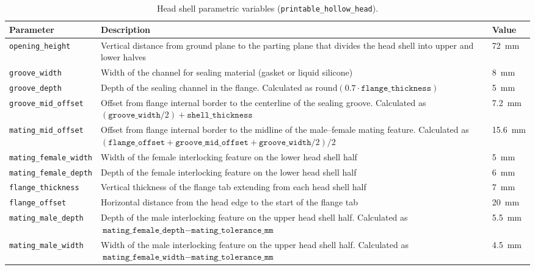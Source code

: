 \begin{table}[h!]
  \centering
  \caption[Head shell CAD parameters]{Head shell parametric variables (\texttt{printable\_hollow\_head}).}
  \label{tab:head_shell_params}
  \small
  \begin{tabularx}{\textwidth}{l X l}
    \toprule
    \textbf{Parameter} & \textbf{Description} & \textbf{Value} \\
    \midrule
    \texttt{opening\_height}  & Vertical distance from ground plane to the parting plane that divides the head shell into upper and lower halves & 72~mm \\[2pt]
    \texttt{groove\_width}  & Width of the channel for sealing material (gasket or liquid silicone) & 8~mm \\[2pt]
    \texttt{groove\_depth}  & Depth of the sealing channel in the flange. Calculated as $\mathrm{round}(0.7 \cdot \texttt{flange\_thickness})$ & 5~mm \\[2pt]
    \texttt{groove\_mid\_offset}  & Offset from flange internal border to the centerline of the sealing groove. Calculated as $(\texttt{groove\_width} / 2) + \texttt{shell\_thickness}$ & 7.2~mm \\[2pt]
    \texttt{mating\_mid\_offset}  & Offset from flange internal border to the midline of the male–female mating feature. Calculated as $(\texttt{flange\_offset} + \texttt{groove\_mid\_offset} + \texttt{groove\_width} / 2) / 2$ & 15.6~mm \\[2pt]
    \texttt{mating\_female\_width}  & Width of the female interlocking feature on the lower head shell half & 5~mm \\[2pt]
    \texttt{mating\_female\_depth}  & Depth of the female interlocking feature on the lower head shell half & 6~mm \\[2pt]
    \texttt{flange\_thickness}  & Vertical thickness of the flange tab extending from each head shell half & 7~mm \\[2pt]
    \texttt{flange\_offset}  & Horizontal distance from the head edge to the start of the flange tab & 20~mm \\[2pt]
    \texttt{mating\_male\_depth}  & Depth of the male interlocking feature on the upper head shell half. Calculated as $\texttt{mating\_female\_depth} - \texttt{mating\_tolerance\_mm}$ & 5.5~mm \\[2pt]
    \texttt{mating\_male\_width}  & Width of the male interlocking feature on the upper head shell half. Calculated as $\texttt{mating\_female\_width} - \texttt{mating\_tolerance\_mm}$ & 4.5~mm \\[2pt]
    \bottomrule
  \end{tabularx}
\end{table}

